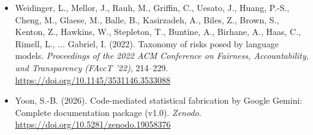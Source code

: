 \begin{itemize}[leftmargin=1.5em, label={}, itemsep=0.08ex, parsep=0pt]
    \item Weidinger, L., Mellor, J., Rauh, M., Griffin, C., Uesato, J., Huang, P.-S., Cheng, M., Glaese, M., Balle, B., Kasirzadeh, A., Biles, Z., Brown, S., Kenton, Z., Hawkins, W., Stepleton, T., Buntine, A., Birhane, A., Haas, C., Rimell, L., ... Gabriel, I. (2022). Taxonomy of risks posed by language models. \textit{Proceedings of the 2022 ACM Conference on Fairness, Accountability, and Transparency (FAccT '22)}, 214--229. \url{https://doi.org/10.1145/3531146.3533088}
    \item Yoon, S.-B. (2026). Code-mediated statistical fabrication by Google Gemini: Complete documentation package (v1.0). \textit{Zenodo}. \url{https://doi.org/10.5281/zenodo.19058376}
\end{itemize}
